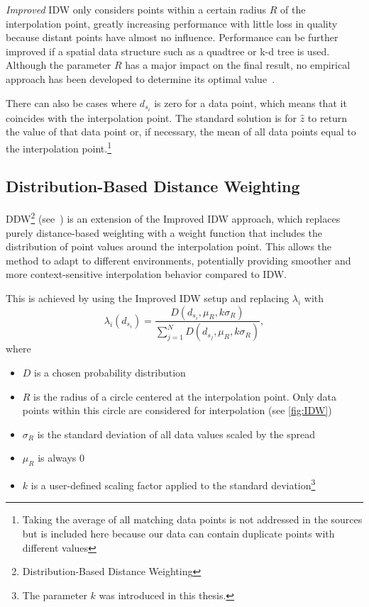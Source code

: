 \emph{Improved} IDW only considers points within a certain radius $R$ of the interpolation point, greatly increasing performance with little loss in quality because distant points have almost no influence. Performance can be further improved if a spatial data structure such as a quadtree or k-d tree is used. Although the parameter $R$ has a major impact on the final result, no empirical approach has been developed to determine its optimal value\ \cite{mdpi:01}.


There can also be cases where $d_{s_i}$ is zero for a data point, which means that it coincides with the interpolation point. The standard solution is for $\hat{z}$ to return the value of that data point or, if necessary, the mean of all data points equal to the interpolation point.\footnote{Taking the average of all matching data points is not addressed in the sources but is included here because our data can contain duplicate points with different values}

\subsection{Distribution-Based Distance Weighting}\label{subsec:ddw}

DDW\footnote{Distribution-Based Distance Weighting} (see\ \cite{mdpi:01}) is an extension of the Improved IDW approach, which replaces purely distance-based weighting with a weight function that includes the distribution of point values around the interpolation point. This allows the method to adapt to different environments, potentially providing smoother and more context-sensitive interpolation behavior compared to IDW\@.

This is achieved by using the Improved IDW setup and replacing $\lambda_i$ with
\[
\lambda_i(d_{s_i}) = \frac{D(d_{s_i}, \mu_R, k\sigma_R)}{\sum_{j=1}^N D(d_{s_j}, \mu_R, k\sigma_R)},
\]
where
\begin{itemize}
    \item $D$ is a chosen probability distribution
    \item $R$ is the radius of a circle centered at the interpolation point. Only data points within this circle are considered for interpolation (see \autoref{fig:IDW})
    \item $\sigma_R$ is the standard deviation of all data values scaled by the spread
    \item $\mu_R$ is always 0
    \item $k$ is a user-defined scaling factor applied to the standard deviation\footnote{The parameter $k$ was introduced in this thesis.}
\end{itemize}


